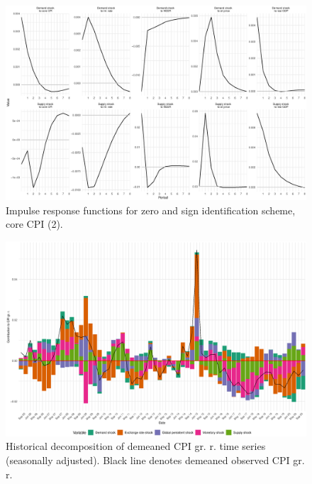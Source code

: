 \documentclass[12pt, a4paper]{extarticle}
\begin{document}
\begin{figure}
	\centering
	\includegraphics[width=0.9\linewidth]{figures/irf_core_2}
	\caption[]{Impulse response functions for zero and sign identification scheme, core CPI (2).}
	\label{fig:irf_core_2}
\end{figure}

\begin{figure}
	\centering
	\includegraphics[width=0.95\linewidth]{figures/hd_cpi_full}
	\caption[]{Historical decomposition of demeaned CPI gr. r. time series (seasonally adjusted). Black line denotes demeaned observed CPI gr. r.}
	\label{fig:hd_cpi_full}
\end{figure}
\end{document}
